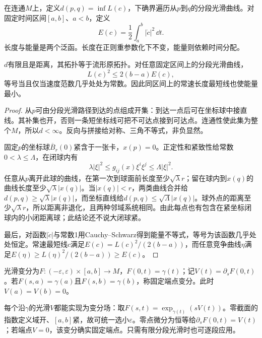 \begin{definition}[长度距离与能量]\label{def:riemannian-distance}
在连通$M$上，定义$d(p,q)=\inf L(c)$，下确界遍历从$p$到$q$的分段光滑曲线。对固定时间区间$[a,b]$、$a<b$，定义
\[
 E(c)=\frac12\int_a^b|\dot c|^2\,\dd t.
\]
长度与能量是两个泛函。长度在正则重参数化下不变，能量则依赖时间分配。
\end{definition}

\begin{proposition}[距离、拓扑与能量比较]\label{prop:distance-topology}
$d$有限且是距离，其拓扑等于流形原拓扑。对任意固定区间上的分段光滑曲线，
\[
 L(c)^2\leq2(b-a)E(c),
\]
等号当且仅当速度范数几乎处处为常数。因此同区间上的常速长度最短线也使能量最小。
\end{proposition}
\begin{proof}
从$p$可由分段光滑路径到达的点组成开集：到达一点后可在坐标球中接直线。其补集也开，否则一条短坐标线可把不可达点接到可达点。连通性使此集为整个$M$，所以$d<\infty$。反向与拼接给对称、三角不等式，非负显然。

固定$p$的坐标球$\overline B_r(0)$紧含于一张卡，$x(p)=0$。正定性和紧致性给常数$0<\lambda\leq\Lambda$，在闭球内有
\[
 \lambda|\xi|^2\leq g_{ij}(x)\xi^i\xi^j\leq\Lambda|\xi|^2.
\]
任意从$p$离开此球的曲线，在第一次到球面前长度至少$\sqrt\lambda r$；留在球内到$x(q)$的曲线长度至少$\sqrt\lambda|x(q)|$。当$|x(q)|<r$，两类曲线合并给$d(p,q)\geq\sqrt\lambda|x(q)|$，而坐标直线给$d(p,q)\leq\sqrt\Lambda|x(q)|$。球外点的距离至少$\sqrt\lambda r$，所以距离非退化，且两种邻域系统相同。由此每点也有包含在紧坐标闭球内的小闭距离球；此结论还不说大闭球紧。

最后，对函数$|\dot c|$与常数1用Cauchy--Schwarz得到能量不等式，等号为该函数几乎处处恒定。常速最短线$c$满足$E(c)=L(c)^2/(2(b-a))$，而任意竞争曲线$\eta$满足$E(\eta)\geq L(\eta)^2/(2(b-a))\geq E(c)$。
\end{proof}

\begin{definition}[变分与变分场]
光滑变分为$F:(-\varepsilon,\varepsilon)\times[a,b]\to M$，$F(0,t)=\gamma(t)$；记$V(t)=\partial_sF(0,t)$。若$F(s,a)=\gamma(a)$且$F(s,b)=\gamma(b)$，称固定端点变分。此时$V(a)=V(b)=0$。
\end{definition}

每个沿$\gamma$的光滑$V$都能实现为变分场：取$F(s,t)=\exp_{\gamma(t)}(sV(t))$。零截面的指数定义域开、$[a,b]$紧，故可统一选小$\varepsilon$。零点微分为恒等给$\partial_sF(0,t)=V(t)$；若端点$V=0$，该变分确实固定端点。只需有限分段光滑时也可逐段应用。

